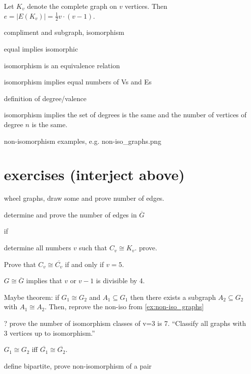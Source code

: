 \begin{theorem} \label{thm:edges_in_Kv} Let $K_v$ denote the complete graph on $v$ vertices.  Then $e=|E(K_v)|= \frac{1}{2} v \cdot (v-1)$.
\end{theorem}

\begin{definition} compliment and subgraph, isomorphism
\end{definition}

equal implies isomorphic

isomorphism is an equivalence relation

isomorphism implies equal numbers of Vs and Es

definition of degree/valence

isomorphism implies the set of degrees is the same and the number of vertices of degree $n$ is the same.

non-isomorphism examples, e.g. non-iso_graphs.png \label{ex:non-iso_graphs}

\section*{exercises (interject above)}

wheel graphs, draw some and prove number of edges.

determine and prove the number of edges in $\overline{G}$

if

determine all numbers $v$ such that $C_v \cong K_v$. prove.

Prove that $C_v \cong \overline{C_v}$ if and only if $v = 5$.

$G \cong \overline{G}$ implies that $v$ or $v-1$ is divisible by 4.

Maybe theorem: if $G_1 \cong G_2$ and $A_1 \subseteq G_1$ then there exists a subgraph $A_2 \subseteq G_2$ with $A_1 \cong A_2$.  Then, reprove the non-iso from \ref{ex:non-iso_graphs}

? prove the number of isomorphism classes of v=3 is 7.  ``Classify all graphs with 3 vertices up to isomorphism.''

$G_1 \cong G_2$ iff $\overline{G_1} \cong \overline{G_2}$.

define bipartite, prove non-isomorphism of a pair
